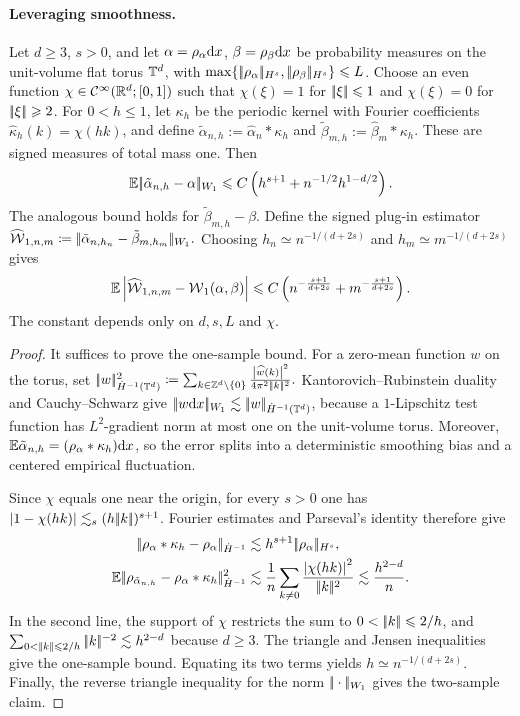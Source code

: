 \paragraph{Leveraging smoothness.}
\begin{prop}\label{prop-smooth-plugin-w1-rate}
Let \(d\geq3\), \(s>0\), and let \(\alpha=\rho_{\alpha}\mathrm{d} x\), \(\beta=\rho_{\beta}\mathrm{d} x\) be probability measures on the unit-volume flat torus \(\mathbb{T}^d\), with \(\max\{|\!| \rho_{\alpha} |\!|_{H^s},|\!| \rho_{\beta} |\!|_{H^s}\}\leqslant L\). Choose an even function \(\chi\in\mathcal{C}^\infty(\mathbb{R}^d;[0,1])\) such that \(\chi(\xi)=1\) for \(|\!| \xi |\!|\leqslant1\) and \(\chi(\xi)=0\) for \(|\!| \xi |\!|\geqslant2\). For \(0<h\leq1\), let \(\kappa_h\) be the periodic kernel with Fourier coefficients \(\widehat\kappa_h(k)=\chi(hk)\), and define \(\tilde\alpha_{n,h}:=\hat\alpha_n\ast\kappa_h\) and \(\tilde\beta_{m,h}:=\hat\beta_m\ast\kappa_h\). These are signed measures of total mass one. Then
\[
\mathbb{E}|\!| \tilde\alpha_{n,h}-\alpha |\!|_{W_1}
\leqslant
C\left(h^{s+1}+n^{-1/2}h^{1-d/2}\right).
\]
The analogous bound holds for \(\tilde\beta_{m,h}-\beta\). Define the signed plug-in estimator
\(\widehat{\operatorname{\mathcal{W}}}_{1,n,m} \coloneqq |\!| \tilde\alpha_{n,h_n}-\tilde\beta_{m,h_m} |\!|_{W_1}.\)
Choosing \(h_n\simeq n^{-1/(d+2s)}\) and \(h_m\simeq m^{-1/(d+2s)}\) gives
\[
\mathbb{E}\left\lvert
\widehat{\operatorname{\mathcal{W}}}_{1,n,m}
-
\operatorname{\mathcal{W}}_1(\alpha,\beta)\right\rvert
\leqslant
C\left(n^{-\frac{s+1}{d+2s}}+m^{-\frac{s+1}{d+2s}}\right).
\]
The constant depends only on \(d,s,L\) and \(\chi\).
\end{prop}
\begin{proof}
It suffices to prove the one-sample bound. For a zero-mean function \(w\) on the torus, set
\(|\!| w |\!|_{\dot H^{-1}(\mathbb{T}^d)}^2 \coloneqq \sum_{k\in\mathbb{Z}^d\setminus\{0\}} \frac{\left\lvert\widehat w(k)\right\rvert^2}{4\pi^2|\!| k |\!|^2}.\)
Kantorovich--Rubinstein duality and Cauchy--Schwarz give \(|\!| w\mathrm{d} x |\!|_{W_1}\lesssim|\!| w |\!|_{\dot H^{-1}(\mathbb{T}^d)}\), because a \(1\)-Lipschitz test function has \(L^2\)-gradient norm at most one on the unit-volume torus. Moreover, \(\mathbb{E}\tilde\alpha_{n,h}=(\rho_{\alpha}\ast\kappa_h)\mathrm{d} x\), so the error splits into a deterministic smoothing bias and a centered empirical fluctuation.

Since \(\chi\) equals one near the origin, for every \(s>0\) one has \(\left\lvert1-\chi(hk)\right\rvert\lesssim_s(h|\!| k |\!|)^{s+1}\). Fourier estimates and Parseval's identity therefore give
\[
\begin{aligned}
\norm{\density{\alpha}\ast\kappa_h-\density{\alpha}}_{\dot H^{-1}}
&\lesssim h^{s+1}\norm{\density{\alpha}}_{H^s},\\
\EE\norm{\density{\tilde\alpha_{n,h}}-\density{\alpha}\ast\kappa_h}_{\dot H^{-1}}^2
&\lesssim \frac1n\sum_{k\neq0}\frac{\abs{\chi(hk)}^2}{\norm{k}^2}
\lesssim \frac{h^{2-d}}n.
\end{aligned}
\]
In the second line, the support of \(\chi\) restricts the sum to \(0<\norm{k}\leq2/h\), and \(\sum_{0<\norm{k}\leq2/h}\norm{k}^{-2}\lesssim h^{2-d}\) because \(d\geq3\). The triangle and Jensen inequalities give the one-sample bound. Equating its two terms yields \(h\simeq n^{-1/(d+2s)}\). Finally, the reverse triangle inequality for the norm \(|\!| \cdot |\!|_{W_1}\) gives the two-sample claim.
\end{proof}
